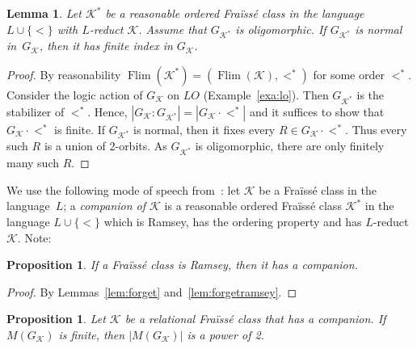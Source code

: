 \documentclass[12pt]{amsart}
\theoremstyle{plain}
\newtheorem{lemma}[theorem]{Lemma}
\newtheorem{proposition}[theorem]{Proposition}
\theoremstyle{definition}
\begin{document}
\begin{lemma}\label{lem:normalfinite} 
Let ${\mathcal K}^*$ be a reasonable ordered Fra\"iss\'e class in the 
language $L\cup\{<\}$ with $L$-reduct ${\mathcal K}$. Assume that $G_{{\mathcal K}^*}$ is oligomorphic.
If $G_{{\mathcal K}^*}$ is normal in~$G_{\mathcal K}$, then it has finite index in $G_{\mathcal K}$.
\end{lemma}

\begin{proof}
By reasonability $\operatorname{Flim}({\mathcal K}^*)=(\operatorname{Flim}({\mathcal K}),<^*)$ for some order $<^*$.
Consider the logic action of $G_{\mathcal K}$ on $\textit{LO}$ (Example~\ref{exa:lo}). Then $G_{{\mathcal K}^*}$ is the stabilizer of $<^*$.
Hence, $|G_{\mathcal K}:G_{{\mathcal K}^*}|=|G_{\mathcal K}\cdot <^*|$ and it suffices to show that $G_{\mathcal K}\cdot <^*$ is finite. 
If $G_{{\mathcal K}^*}$ is normal, then it fixes every $R\in G_{\mathcal K}\cdot <^*$. Thus every such $R$ is a union of 2-orbits.
As $G_{{\mathcal K}^*}$ is oligomorphic, there are only finitely many such $R$. 
\end{proof}

We use the following mode of speech from~\cite{akl}: let ${\mathcal K}$ be a Fra\"iss\'e class in the language~$L$; 
a {\em companion of ${\mathcal K}$} is a reasonable ordered Fra\"iss\'e class ${\mathcal K}^*$
in the language $L\cup\{<\}$ which is Ramsey, has the ordering property and has $L$-reduct ${\mathcal K}$.
Note:

\begin{proposition}\label{prop:ramseycompanion}
If a Fra\"iss\'e class is Ramsey, then it has a companion.
\end{proposition}

\begin{proof}
By Lemmas~\ref{lem:forget} and~\ref{lem:forgetramsey}. 
\end{proof}

\begin{proposition}\label{prop:boolean}
Let ${\mathcal K}$ be a relational Fra\"iss\'e class that has a companion.
If $M(G_{\mathcal K})$ is finite, then $|M(G_{\mathcal K})|$ is a power of 2.
\end{proposition}
\end{document}
